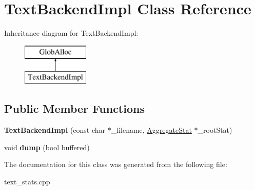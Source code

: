 \hypertarget{classTextBackendImpl}{\section{Text\-Backend\-Impl Class Reference}
\label{classTextBackendImpl}
}
Inheritance diagram for Text\-Backend\-Impl\-:\begin{figure}[H]
\begin{center}
\leavevmode
\includegraphics[height=2.000000cm]{classTextBackendImpl}
\end{center}
\end{figure}
\subsection*{Public Member Functions}
\begin{DoxyCompactItemize}
\item 
\hypertarget{classTextBackendImpl_a24e7677f931bff32ffcf3bd7b2b342b8}{{\bfseries Text\-Backend\-Impl} (const char $\ast$\-\_\-filename, \hyperlink{classAggregateStat}{Aggregate\-Stat} $\ast$\-\_\-root\-Stat)}\label{classTextBackendImpl_a24e7677f931bff32ffcf3bd7b2b342b8}

\item 
\hypertarget{classTextBackendImpl_a5007cdf5ed29bb29b812508b95d4457d}{void {\bfseries dump} (bool buffered)}\label{classTextBackendImpl_a5007cdf5ed29bb29b812508b95d4457d}

\end{DoxyCompactItemize}


The documentation for this class was generated from the following file\-:\begin{DoxyCompactItemize}
\item 
text\-\_\-stats.\-cpp\end{DoxyCompactItemize}
